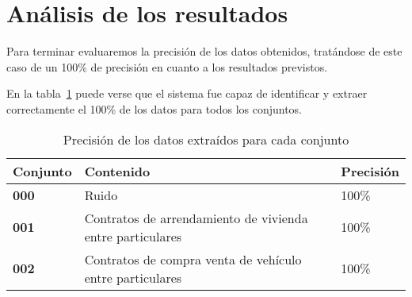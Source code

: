 \section{Análisis de los resultados}

Para terminar evaluaremos la precisión de los datos obtenidos, tratándose de este caso de un 100\%
de precisión en cuanto a los resultados previstos.

En la tabla~\ref{tab:data_set_performance} puede verse que el sistema fue capaz de identificar y extraer
correctamente el 100\% de los datos para todos los conjuntos.

\begin{table}[h]
    \renewcommand{\arraystretch}{1.5}
    \setlength{\tabcolsep}{10pt}
    \centering
    \begin{tabular}{>{\bfseries}p{} p{} p{}}
        \toprule
        \textbf{Conjunto} & \textbf{Contenido}                                        & \textbf{Precisión} \\
        \midrule
        \textbf{000}      & Ruido                                                     & 100\%              \\
        \textbf{001}      & Contratos de arrendamiento de vivienda entre particulares & 100\%              \\
        \textbf{002}      & Contratos de compra venta de vehículo entre particulares  & 100\%              \\
        \bottomrule
    \end{tabular}
    \caption{Precisión de los datos extraídos para cada conjunto}
    \label{tab:data_set_performance}
\end{table}
